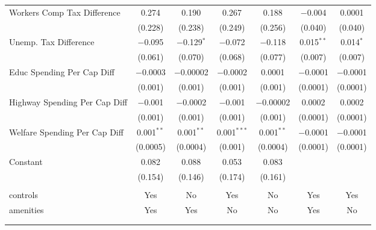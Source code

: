\begin{table}[!htbp]
\begin{tabular}{@{\extracolsep{5pt}}lcccccc}
  Workers Comp Tax Difference & 0.274 & 0.190 & 0.267 & 0.188 & $-$0.004 & 0.0001 \\ 
  & (0.228) & (0.238) & (0.249) & (0.256) & (0.040) & (0.040) \\ 
  Unemp. Tax Difference & $-$0.095 & $-$0.129$^{*}$ & $-$0.072 & $-$0.118 & 0.015$^{**}$ & 0.014$^{*}$ \\ 
  & (0.061) & (0.070) & (0.068) & (0.077) & (0.007) & (0.007) \\ 
  Educ Spending Per Cap Diff & $-$0.0003 & $-$0.00002 & $-$0.0002 & 0.0001 & $-$0.0001 & $-$0.0001 \\ 
  & (0.001) & (0.001) & (0.001) & (0.001) & (0.0001) & (0.0001) \\ 
  Highway Spending Per Cap Diff & $-$0.001 & $-$0.0002 & $-$0.001 & $-$0.00002 & 0.0002 & 0.0002 \\ 
  & (0.001) & (0.001) & (0.001) & (0.001) & (0.0001) & (0.0001) \\ 
  Welfare Spending Per Cap Diff & 0.001$^{**}$ & 0.001$^{**}$ & 0.001$^{***}$ & 0.001$^{**}$ & $-$0.0001 & $-$0.0001 \\ 
  & (0.0005) & (0.0004) & (0.001) & (0.0004) & (0.0001) & (0.0001) \\ 
  Constant & 0.082 & 0.088 & 0.053 & 0.083 &  &  \\ 
  & (0.154) & (0.146) & (0.174) & (0.161) &  &  \\ 
 \hline \\[-1.8ex] 
controls & Yes & No & Yes & No & Yes & Yes \\ 
amenities & Yes & Yes & No & No & Yes & No \\ 
\hline \\[-1.8ex] 
\hline 
\hline \\[-1.8ex] 
\end{tabular} 
\end{table} 
